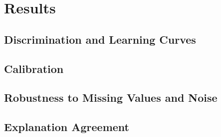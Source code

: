 \section{Results}

\subsection{Discrimination and Learning Curves}

\subsection{Calibration}

\subsection{Robustness to Missing Values and Noise}

\subsection{Explanation Agreement}

% 
